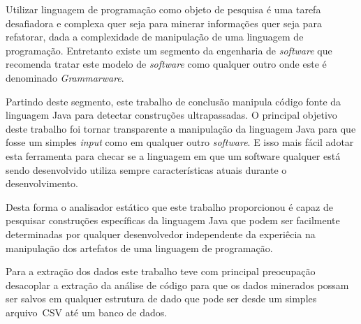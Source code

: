 Utilizar linguagem de programa\c{c}\~{a}o como objeto de pesquisa \'{e} uma tarefa desafiadora e complexa quer seja para minerar informa\c{c}\~{o}es quer seja para refatorar, dada a complexidade de manipula\c{c}\~{a}o de uma linguagem de programa\c{c}\~{a}o. Entretanto existe um segmento da engenharia de \textit{software} que recomenda tratar este modelo de \textit{software} como qualquer outro onde este \'{e} denominado \textit{Grammarware}. 

Partindo deste segmento, este trabalho de conclus\~{a}o manipula c\'{o}digo fonte da linguagem Java para detectar constru\c{c}\~{o}es ultrapassadas. O principal objetivo deste trabalho foi tornar transparente a manipula\c{c}\~{a}o da linguagem Java para que fosse um simples \textit{input} como em qualquer outro \textit{software}. E isso mais f\'{a}cil adotar esta ferramenta para checar se a linguagem em que um software qualquer est\'{a} sendo desenvolvido utiliza sempre caracter\'{i}sticas atuais durante o desenvolvimento.

Desta forma o analisador est\'{a}tico que este trabalho proporcionou \'{e} capaz de pesquisar constru\c{c}\~{o}es espec\'{i}ficas da linguagem Java que podem ser facilmente determinadas por qualquer desenvolvedor independente da experi\^{e}cia na manipula\c{c}\~{a}o dos artefatos de uma linguagem de programa\c{c}\~{a}o.

Para a extra\c{c}\~{a}o dos dados este trabalho teve com principal preocupa\c{c}\~{a}o desacoplar a extra\c{c}\~{a}o da an\'{a}lise de c\'{o}digo para que os dados minerados possam ser salvos em qualquer estrutura de dado que pode ser desde um simples arquivo~\acs{CSV} at\'{e} um banco de dados.



